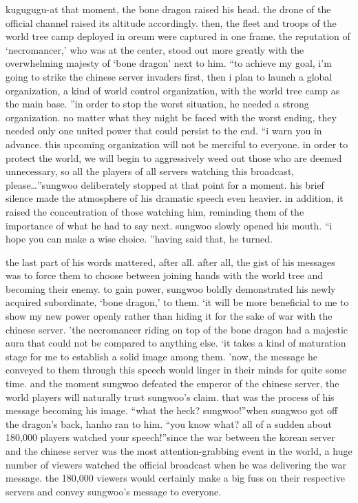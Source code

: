 kugugugu-at that moment, the bone dragon raised his head.
 the drone of the official channel raised its altitude accordingly.
 then, the fleet and troops of the world tree camp deployed in oreum were captured in one frame.
the reputation of ‘necromancer,’ who was at the center, stood out more greatly with the overwhelming majesty of ‘bone dragon’ next to him.
“to achieve my goal, i’m going to strike the chinese server invaders first, then i plan to launch a global organization, a kind of world control organization, with the world tree camp as the main base.
”in order to stop the worst situation, he needed a strong organization.
 no matter what they might be faced with the worst ending, they needed only one united power that could persist to the end.
“i warn you in advance.
 this upcoming organization will not be merciful to everyone.
 in order to protect the world, we will begin to aggressively weed out those who are deemed unnecessary, so all the players of all servers watching this broadcast, please…”sungwoo deliberately stopped at that point for a moment.
 his brief silence made the atmosphere of his dramatic speech even heavier.
in addition, it raised the concentration of those watching him, reminding them of the importance of what he had to say next.
sungwoo slowly opened his mouth.
“i hope you can make a wise choice.
”having said that, he turned.


the last part of his words mattered, after all.
 after all, the gist of his messages was to force them to choose between joining hands with the world tree and becoming their enemy.
to gain power, sungwoo boldly demonstrated his newly acquired subordinate, ‘bone dragon,’ to them.
‘it will be more beneficial to me to show my new power openly rather than hiding it for the sake of war with the chinese server.
’the necromancer riding on top of the bone dragon had a majestic aura that could not be compared to anything else.
‘it takes a kind of maturation stage for me to establish a solid image among them.
’now, the message he conveyed to them through this speech would linger in their minds for quite some time.
 and the moment sungwoo defeated the emperor of the chinese server, the world players will naturally trust sungwoo’s claim.
 that was the process of his message becoming his image.
“what the heck? sungwoo!”when sungwoo got off the dragon’s back, hanho ran to him.
“you know what? all of a sudden about 180,000 players watched your speech!”since the war between the korean server and the chinese server was the most attention-grabbing event in the world, a huge number of viewers watched the official broadcast when he was delivering the war message.
 the 180,000 viewers would certainly make a big fuss on their respective servers and convey sungwoo’s message to everyone.


 